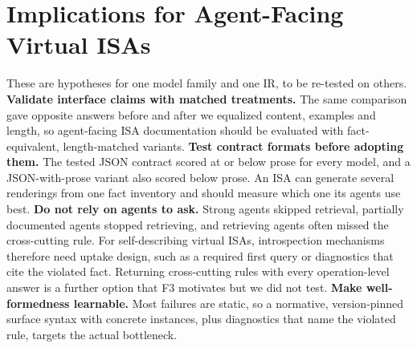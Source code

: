 \documentclass[conference]{IEEEtran}
\begin{document}
\section{Implications for Agent-Facing Virtual ISAs}\label{sec:implications}
These are hypotheses for one model family and one IR, to be re-tested on others.
\textbf{Validate interface claims with matched treatments.} The same comparison gave opposite answers before and after we equalized content, examples and length, so agent-facing ISA documentation should be evaluated with fact-equivalent, length-matched variants.
\textbf{Test contract formats before adopting them.} The tested JSON contract scored at or below prose for every model, and a JSON-with-prose variant also scored below prose. An ISA can generate several renderings from one fact inventory and should measure which one its agents use best.
\textbf{Do not rely on agents to ask.} Strong agents skipped retrieval, partially documented agents stopped retrieving, and retrieving agents often missed the cross-cutting rule. For self-describing virtual ISAs, introspection mechanisms therefore need uptake design, such as a required first query or diagnostics that cite the violated fact. Returning cross-cutting rules with every operation-level answer is a further option that F3 motivates but we did not test.
\textbf{Make well-formedness learnable.} Most failures are static, so a normative, version-pinned surface syntax with concrete instances, plus diagnostics that name the violated rule, targets the actual bottleneck.
\end{document}
